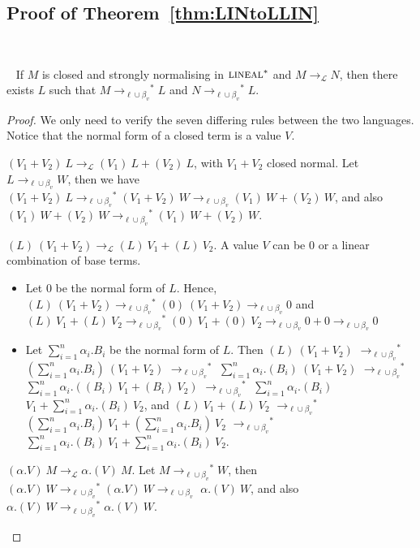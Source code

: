 \documentclass{LMCS}
\makeatletter
\newcommand{\recap}[2]{\medskip\noindent{\bf #1 \ref{#2}.}~}
\newcommand{\olin}{\mbox{\sc lineal}}
\newcommand{\xto}[1]{\ensuremath{\rightarrow_{#1}}}
\newcommand{\toolin}{\xto{\mathcal{L}}}
\newcommand{\toblinred}{\xto{\ell\cup\beta_v}}
\newcommand{\stoblinred}{\ensuremath{\xto{\ell\cup\beta_v}^{\ast}}}
\def\mynobreakpar{\par\nobreak\@afterheading}
\makeatother
\begin{document}
\subsection{Proof of Theorem~\ref{thm:LINtoLLIN}}\label{proof:LINtoLLIN}~
\mynobreakpar
\recap{Theorem}{thm:LINtoLLIN}
If $M$ is closed and strongly normalising in $\olin^*$ and  $M\toolin N$, then there exists $L$ such that $M\stoblinred L$ and $N\stoblinred L$.\mynobreakpar
\begin{proof}
  We only need to verify the seven differing rules between the two languages.
  Notice that the normal form of a closed term is a value $V$.
  \begin{myenumerate}
    \item $(V_1+V_2)~L\toolin (V_1)~L+(V_2)~L$, with $V_1+V_2$ closed normal. 
      Let $L\toblinred W$, then we have
      $(V_1+V_2)~L\stoblinred (V_1+V_2)~W\toblinred (V_1)~W+(V_2)~W$,
      and also
      $(V_1)~W+(V_2)~W\stoblinred(V_1)~W+(V_2)~W$.
    \item $(L)~(V_1+V_2)\toolin(L)~V_1+(L)~V_2$. A value $V$ can be $0$ or a linear combination of base terms.
      \begin{itemize}
	\item Let $0$ be the normal form of $L$. Hence,
	  $(L)~(V_1+V_2)\stoblinred(0)~(V_1+V_2)\toblinred 0$
	  and
	  $(L)~V_1+(L)~V_2\stoblinred (0)~V_1+(0)~V_2\toblinred 0+0\toblinred 0$
	\item Let $\sum\limits_{i=1}^n\alpha_i.B_i$ be the normal form of $L$. Then
	  $(L)~(V_1+V_2)$
	  $\stoblinred$ $(\sum\limits_{i=1}^n\alpha_i.B_i)~(V_1+V_2)$
	  $\stoblinred$ $\sum\limits_{i=1}^n\alpha_i.(B_i)~(V_1+V_2)$
	  $\stoblinred$ $\sum\limits_{i=1}^n\alpha_i.((B_i)~V_1+(B_i)~V_2)$
	  $\stoblinred$ $\sum\limits_{i=1}^n\alpha_i.(B_i)$
	  $V_1+\sum\limits_{i=1}^n\alpha_i.(B_i)~V_2$,
	  and
	  $(L)~V_1+(L)~V_2$
	  $\stoblinred$ $(\sum\limits_{i=1}^n\alpha_i.B_i)~V_1+(\sum\limits_{i=1}^n\alpha_i.B_i)~V_2$
	  $\stoblinred$ $\sum\limits_{i=1}^n\alpha_i.(B_i)~V_1+\sum\limits_{i=1}^n\alpha_i.(B_i)~V_2$.
      \end{itemize}

    \item $(\alpha.V)~M\toolin \alpha.(V)~M$. Let $M\stoblinred W$, then 
      $(\alpha.V)~W\stoblinred(\alpha.V)~W\toblinred$
      $\alpha.(V)~W$,
      and also
      $\alpha.(V)~W\stoblinred\alpha.(V)~W$.


\end{myenumerate}
\end{proof}
\end{document}
